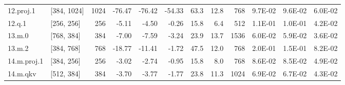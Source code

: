 \begin{table}
\begin{tabular}{llrrrrrrrrrr}
12.proj.1 & [384, 1024] & 1024 & {\cellcolor[HTML]{A50026}} \color[HTML]{F1F1F1} -76.47 & {\cellcolor[HTML]{A50026}} \color[HTML]{F1F1F1} -76.42 & {\cellcolor[HTML]{E95538}} \color[HTML]{F1F1F1} -54.33 & 63.3 & 12.8 & 768 & {\cellcolor[HTML]{FECA79}} \color[HTML]{000000} 9.7E-02 & {\cellcolor[HTML]{FECC7B}} \color[HTML]{000000} 9.6E-02 & {\cellcolor[HTML]{FFFAB6}} \color[HTML]{000000} 6.0E-02 \\
12.q.1 & [256, 256] & 256 & {\cellcolor[HTML]{F8FCB6}} \color[HTML]{000000} -5.11 & {\cellcolor[HTML]{F5FBB2}} \color[HTML]{000000} -4.50 & {\cellcolor[HTML]{EBF7A3}} \color[HTML]{000000} -0.26 & 15.8 & 6.4 & 512 & {\cellcolor[HTML]{FDBD6D}} \color[HTML]{000000} 1.1E-01 & {\cellcolor[HTML]{FDBF6F}} \color[HTML]{000000} 1.0E-01 & {\cellcolor[HTML]{ECF7A6}} \color[HTML]{000000} 4.2E-02 \\
13.m.0 & [768, 384] & 384 & {\cellcolor[HTML]{FDFEBC}} \color[HTML]{000000} -7.00 & {\cellcolor[HTML]{FEFFBE}} \color[HTML]{000000} -7.59 & {\cellcolor[HTML]{F2FAAE}} \color[HTML]{000000} -3.24 & 23.9 & 13.7 & 1536 & {\cellcolor[HTML]{FFFBB8}} \color[HTML]{000000} 6.0E-02 & {\cellcolor[HTML]{FFFBB8}} \color[HTML]{000000} 5.9E-02 & {\cellcolor[HTML]{E6F59D}} \color[HTML]{000000} 3.6E-02 \\
13.m.2 & [384, 768] & 768 & {\cellcolor[HTML]{FEE695}} \color[HTML]{000000} -18.77 & {\cellcolor[HTML]{FFF7B2}} \color[HTML]{000000} -11.41 & {\cellcolor[HTML]{EEF8A8}} \color[HTML]{000000} -1.72 & 47.5 & 12.0 & 768 & {\cellcolor[HTML]{A50026}} \color[HTML]{F1F1F1} 2.0E-01 & {\cellcolor[HTML]{E95538}} \color[HTML]{F1F1F1} 1.5E-01 & {\cellcolor[HTML]{FEE491}} \color[HTML]{000000} 8.2E-02 \\
14.m.proj.1 & [384, 256] & 256 & {\cellcolor[HTML]{F2FAAE}} \color[HTML]{000000} -3.02 & {\cellcolor[HTML]{F1F9AC}} \color[HTML]{000000} -2.74 & {\cellcolor[HTML]{ECF7A6}} \color[HTML]{000000} -0.95 & 15.8 & 8.0 & 768 & {\cellcolor[HTML]{FEDE89}} \color[HTML]{000000} 8.6E-02 & {\cellcolor[HTML]{FEE08B}} \color[HTML]{000000} 8.5E-02 & {\cellcolor[HTML]{F7FCB4}} \color[HTML]{000000} 4.9E-02 \\
14.m.qkv & [512, 384] & 384 & {\cellcolor[HTML]{F4FAB0}} \color[HTML]{000000} -3.70 & {\cellcolor[HTML]{F4FAB0}} \color[HTML]{000000} -3.77 & {\cellcolor[HTML]{EEF8A8}} \color[HTML]{000000} -1.77 & 23.8 & 11.3 & 1024 & {\cellcolor[HTML]{FFF1A8}} \color[HTML]{000000} 6.9E-02 & {\cellcolor[HTML]{FFF2AA}} \color[HTML]{000000} 6.7E-02 & {\cellcolor[HTML]{EEF8A8}} \color[HTML]{000000} 4.3E-02 \\

\end{tabular}
\end{table}
